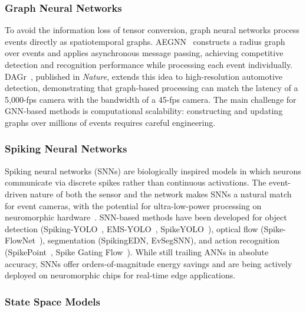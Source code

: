 \subsubsection{Graph Neural Networks}
\label{sec:paradigm_gnn}

To avoid the information loss of tensor conversion, graph neural networks process events directly as spatiotemporal graphs. AEGNN~\cite{schaefer2022aegnn} constructs a radius graph over events and applies asynchronous message passing, achieving competitive detection and recognition performance while processing each event individually. DAGr~\cite{gehrig2024dagr}, published in \textit{Nature}, extends this idea to high-resolution automotive detection, demonstrating that graph-based processing can match the latency of a 5,000-fps camera with the bandwidth of a 45-fps camera. The main challenge for GNN-based methods is computational scalability: constructing and updating graphs over millions of events requires careful engineering.


\subsubsection{Spiking Neural Networks}
\label{sec:paradigm_snn}

Spiking neural networks (SNNs) are biologically inspired models in which neurons communicate via discrete spikes rather than continuous activations. The event-driven nature of both the sensor and the network makes SNNs a natural match for event cameras, with the potential for ultra-low-power processing on neuromorphic hardware~\cite{davies2018loihi,liu2023speck}. SNN-based methods have been developed for object detection (Spiking-YOLO~\cite{kim2020spikingyolo}, EMS-YOLO~\cite{su2023emsyolo}, SpikeYOLO~\cite{li2024spikeyolo}), optical flow (Spike-FlowNet~\cite{lee2020spikeflownet}), segmentation (SpikingEDN, EvSegSNN), and action recognition (SpikePoint~\cite{ren2024spikepoint}, Spike Gating Flow~\cite{zhang2022spikegatingflow}). While still trailing ANNs in absolute accuracy, SNNs offer orders-of-magnitude energy savings and are being actively deployed on neuromorphic chips for real-time edge applications.


\subsubsection{State Space Models}
\label{sec:paradigm_ssm}


